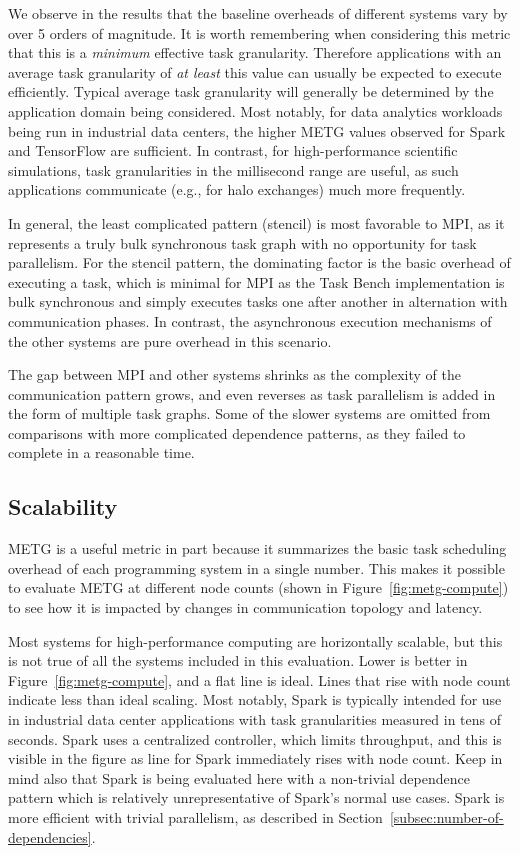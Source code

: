We observe in the results that the baseline overheads of different
systems vary by over 5 orders of magnitude. It is worth
remembering when considering this metric that this is a \emph{minimum}
effective task granularity. Therefore applications with an average
task granularity of \emph{at least} this value can usually be expected
to execute efficiently. Typical average task granularity will
generally be determined by the application domain being
considered. Most notably, for data analytics workloads being run in
industrial data centers, the higher METG values observed for Spark and
TensorFlow are sufficient. In contrast, for high-performance
scientific simulations, task granularities in the millisecond range
are useful, as such applications communicate (e.g., for halo
exchanges) much more frequently.

In general, the least complicated pattern (stencil) is most favorable
to MPI, as it represents a truly bulk synchronous task graph with no
opportunity for task parallelism. For the stencil pattern, the
dominating factor is the basic overhead of executing a task, which is
minimal for MPI as the Task Bench implementation is bulk synchronous
and simply executes tasks one after another in alternation with
communication phases. In contrast, the asynchronous execution
mechanisms of the other systems are pure overhead in this scenario.

The gap between MPI and other systems shrinks as the complexity of the
communication pattern grows, and even reverses as task parallelism is
added in the form of multiple task graphs. Some of the slower systems
are omitted from comparisons with more complicated dependence
patterns, as they failed to complete in a reasonable time.

\subsection{Scalability}
\label{subsec:scalability}

METG is a useful metric in part because it summarizes the basic task
scheduling overhead of each programming system in a single number. This makes it
possible to evaluate METG at different node counts (shown in
Figure~\ref{fig:metg-compute}) to see how it is impacted by changes in
communication topology and latency.


Most systems for high-performance computing are horizontally scalable,
but this is not true of all the systems included in this
evaluation. Lower is better in Figure~\ref{fig:metg-compute}, and a
flat line is ideal. Lines that rise with node count indicate less than
ideal scaling. Most notably, Spark is typically
intended for use in industrial data center applications with task
granularities measured in tens of seconds. Spark uses a centralized
controller, which limits throughput, and this is visible in the figure
as line for Spark immediately rises with node count. Keep in mind also
that Spark is being evaluated here with a non-trivial dependence
pattern which is relatively unrepresentative of Spark's normal use
cases. Spark is more efficient with trivial parallelism, as described
in Section~\ref{subsec:number-of-dependencies}.


